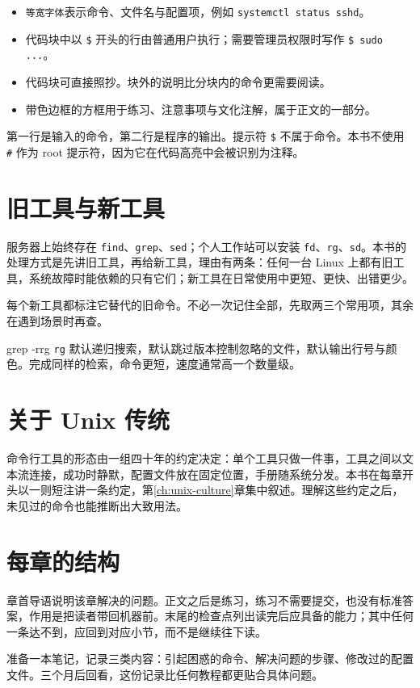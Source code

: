 \begin{itemize}
  \item \texttt{等宽字体}表示命令、文件名与配置项，例如 \texttt{systemctl status sshd}。
  \item 代码块中以 \texttt{\$} 开头的行由普通用户执行；需要管理员权限时写作 \texttt{\$ sudo ...}。
  \item 代码块可直接照抄。块外的说明比分块内的命令更需要阅读。
  \item 带色边框的方框用于练习、注意事项与文化注解，属于正文的一部分。
\end{itemize}


第一行是输入的命令，第二行是程序的输出。提示符 \texttt{\$} 不属于命令。本书不使用 \texttt{\#} 作为 root 提示符，因为它在代码高亮中会被识别为注释。

\section*{旧工具与新工具}

服务器上始终存在 \texttt{find}、\texttt{grep}、\texttt{sed}；个人工作站可以安装 \texttt{fd}、\texttt{rg}、\texttt{sd}。本书的处理方式是先讲旧工具，再给新工具，理由有两条：任何一台 Linux 上都有旧工具，系统故障时能依赖的只有它们；新工具在日常使用中更短、更快、出错更少。

每个新工具都标注它替代的旧命令。不必一次记住全部，先取两三个常用项，其余在遇到场景时再查。

\begin{toolswap}{grep -r}{rg}
\texttt{rg} 默认递归搜索，默认跳过版本控制忽略的文件，默认输出行号与颜色。完成同样的检索，命令更短，速度通常高一个数量级。
\end{toolswap}

\section*{关于 Unix 传统}

命令行工具的形态由一组四十年的约定决定：单个工具只做一件事，工具之间以文本流连接，成功时静默，配置文件放在固定位置，手册随系统分发。本书在每章开头以一则短注讲一条约定，第\ref{ch:unix-culture}章集中叙述。理解这些约定之后，未见过的命令也能推断出大致用法。

\section*{每章的结构}

章首导语说明该章解决的问题。正文之后是练习，练习不需要提交，也没有标准答案，作用是把读者带回机器前。末尾的检查点列出读完后应具备的能力；其中任何一条达不到，应回到对应小节，而不是继续往下读。

准备一本笔记，记录三类内容：引起困惑的命令、解决问题的步骤、修改过的配置文件。三个月后回看，这份记录比任何教程都更贴合具体问题。
